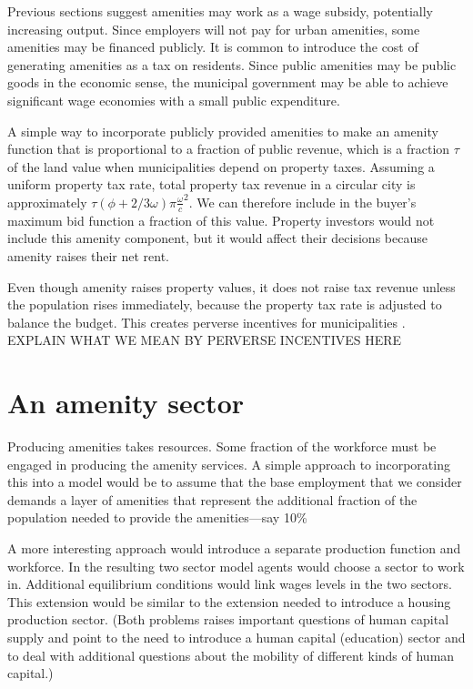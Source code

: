 Previous sections suggest amenities may work as a wage subsidy, potentially increasing output. Since employers will not pay %
for urban amenities, some amenities may be financed publicly. It is common to introduce the cost of generating amenities as a tax on residents.  Since public amenities may be \glspl{public good} in the economic sense, the municipal government may be able to achieve significant wage economies with a small public expenditure.

A simple way to incorporate publicly provided amenities to make an amenity function that is proportional to a fraction of public revenue, which is a fraction $\tau$ of the land value when municipalities depend on property taxes. Assuming a uniform property tax rate, total property tax revenue in a circular city is approximately $\tau(\phi+2/3 \omega)\pi \frac{\omega}{c}^2$. We can therefore include in the buyer's maximum bid function a fraction of this value. Property investors would not include this amenity component, but it would affect their decisions because amenity raises their net rent.

Even though amenity raises property values, it does not raise tax revenue unless the population rises immediately, because the property tax rate is adjusted to balance the budget. This creates perverse incentives for municipalities \cite{blaisPerverseCitiesHidden2011}. {\color{red} EXPLAIN WHAT WE MEAN BY PERVERSE INCENTIVES HERE
}

\section{An amenity sector}
Producing amenities takes resources. Some fraction of the workforce must be engaged in producing the amenity services. A simple approach to incorporating this into a model would be to assume that the base employment that we consider demands a layer of amenities that represent the additional fraction of the population needed to provide the amenities---say 10\%  

A more interesting approach would introduce a separate production function and workforce. In the  resulting two sector model agents would choose a sector to work in. Additional equilibrium conditions would link wages levels in the two sectors. This extension would be similar to the extension needed to introduce a housing production sector. (Both problems raises important questions of human capital supply and point to the need to introduce a human capital (education) sector and to deal with additional questions about the mobility of different kinds of human capital.)



